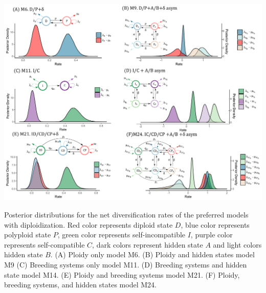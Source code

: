 \begin{suppfigure}
\includegraphics[width=\textwidth]{figS18.pdf}
\caption{Posterior distributions for the net diversification rates of the preferred models with diploidization. Red color represents diploid state $D$, blue color represents polyploid state $P$, green color represents self-incompatible $I$, purple color represents self-compatible $C$,  dark colors represent hidden state $A$ and light colors hidden state $B$.  (A) Ploidy only model M6. (B) Ploidy and hidden states model M9 (C) Breeding systems only model M11. (D) Breeding systems and hidden state model M14. (E) Ploidy and breeding systems model M21. (F) Ploidy, breeding systems, and hidden states model M24.} %
\label{suppfigure:alldip}
\end{suppfigure}


